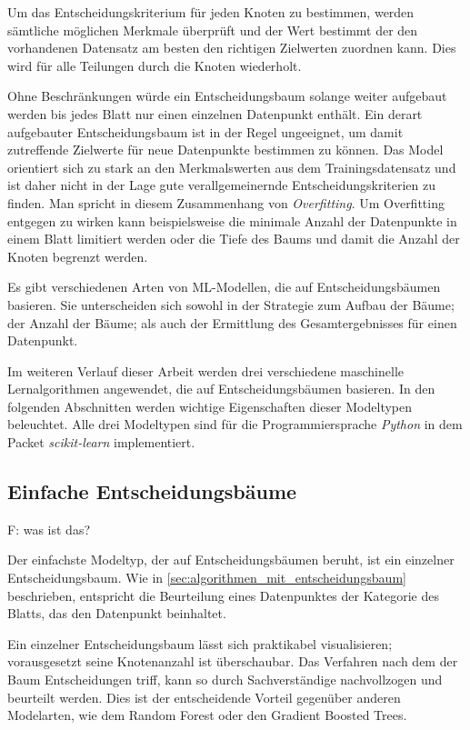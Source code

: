Um das Entscheidungskriterium für jeden Knoten zu bestimmen, werden sämtliche möglichen Merkmale überprüft und der Wert bestimmt der den vorhandenen Datensatz am besten den richtigen Zielwerten zuordnen kann. Dies wird für alle Teilungen durch die Knoten wiederholt.~\cite{Muller.2017}

Ohne Beschränkungen würde ein Entscheidungsbaum solange weiter aufgebaut werden bis jedes Blatt nur einen einzelnen Datenpunkt enthält. Ein derart aufgebauter Entscheidungsbaum ist in der Regel ungeeignet, um damit zutreffende Zielwerte für neue Datenpunkte bestimmen zu können. Das Model orientiert sich zu stark an den Merkmalswerten aus dem Trainingsdatensatz und ist daher nicht in der Lage gute verallgemeinernde Entscheidungskriterien zu finden. Man spricht in diesem Zusammenhang von \textit{Overfitting}. Um Overfitting entgegen zu wirken kann beispielsweise die minimale Anzahl der Datenpunkte in einem Blatt limitiert werden oder die Tiefe des Baums und damit die Anzahl der Knoten begrenzt werden.

Es gibt verschiedenen Arten von ML-Modellen, die auf Entscheidungsbäumen basieren. Sie unterscheiden sich sowohl in der Strategie zum Aufbau der Bäume; der Anzahl der Bäume; als auch der Ermittlung des Gesamtergebnisses für einen Datenpunkt. 

Im weiteren Verlauf dieser Arbeit werden drei verschiedene maschinelle Lernalgorithmen angewendet, die auf Entscheidungsbäumen basieren. In den folgenden Abschnitten werden wichtige Eigenschaften dieser Modeltypen beleuchtet. Alle drei Modeltypen sind für die Programmiersprache \textit{Python} in dem Packet \textit{scikit-learn} implementiert.
\subsection{Einfache Entscheidungsbäume}
\label{sec:einfache_entscheidungsbaeume}
F: was ist das?

Der einfachste Modeltyp, der auf Entscheidungsbäumen beruht, ist ein einzelner Entscheidungsbaum. Wie in \cref{sec:algorithmen_mit_entscheidungsbaum} beschrieben, entspricht die Beurteilung eines Datenpunktes der Kategorie des Blatts, das den Datenpunkt beinhaltet.

Ein einzelner Entscheidungsbaum lässt sich praktikabel visualisieren; vorausgesetzt seine Knotenanzahl ist überschaubar. Das Verfahren nach dem der Baum Entscheidungen triff, kann so durch Sachverständige nachvollzogen und beurteilt werden. Dies ist der entscheidende Vorteil gegenüber anderen Modelarten, wie dem Random Forest oder den Gradient Boosted Trees.

